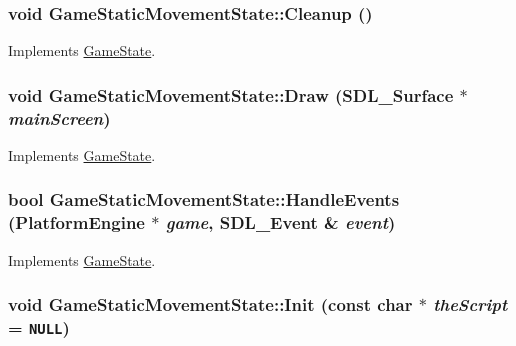 \hypertarget{class_game_static_movement_state_072662abaf5a872f7919e7fc44200a04}{
\subsubsection[{Cleanup}]{\setlength{\rightskip}{0pt plus 5cm}void GameStaticMovementState::Cleanup ()}}
\label{d7/d3b/class_game_static_movement_state_072662abaf5a872f7919e7fc44200a04}




Implements \hyperlink{class_game_state_041e7a5430d71da84745af11abdacd93}{GameState}.\hypertarget{class_game_static_movement_state_2c2d82b3dbc8e431682b53ce05294f27}{
\subsubsection[{Draw}]{\setlength{\rightskip}{0pt plus 5cm}void GameStaticMovementState::Draw (SDL\_\-Surface $\ast$ {\em mainScreen})}}
\label{d7/d3b/class_game_static_movement_state_2c2d82b3dbc8e431682b53ce05294f27}




Implements \hyperlink{class_game_state_1b93233932defca939eed4c0676a5d2a}{GameState}.\hypertarget{class_game_static_movement_state_c73d6f93fee2ac6cb2788eb2984bb305}{
\subsubsection[{HandleEvents}]{\setlength{\rightskip}{0pt plus 5cm}bool GameStaticMovementState::HandleEvents ({\bf PlatformEngine} $\ast$ {\em game}, \/  SDL\_\-Event \& {\em event})}}
\label{d7/d3b/class_game_static_movement_state_c73d6f93fee2ac6cb2788eb2984bb305}




Implements \hyperlink{class_game_state_de7bd9bda91253614322ca0ea77b7a14}{GameState}.\hypertarget{class_game_static_movement_state_4cb4be5ea96a6bb7b06c79bed64c355d}{
\subsubsection[{Init}]{\setlength{\rightskip}{0pt plus 5cm}void GameStaticMovementState::Init (const char $\ast$ {\em theScript} = {\tt NULL})}}
\label{d7/d3b/class_game_static_movement_state_4cb4be5ea96a6bb7b06c79bed64c355d}




